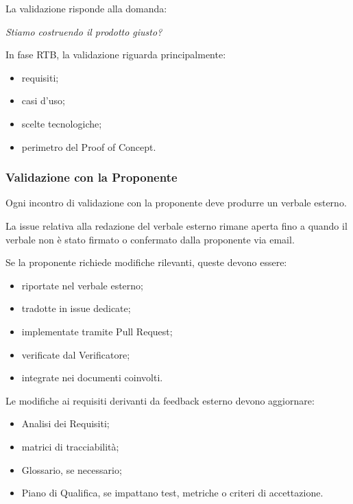 La validazione risponde alla domanda:

\begin{center}
    \textit{Stiamo costruendo il prodotto giusto?}
\end{center}

In fase RTB, la validazione riguarda principalmente:

\begin{itemize}
    \item requisiti;
    \item casi d'uso;
    \item scelte tecnologiche;
    \item perimetro del Proof of Concept.
\end{itemize}


\subsubsection{Validazione con la Proponente}

Ogni incontro di validazione con la proponente deve produrre un verbale esterno.

La issue relativa alla redazione del verbale esterno rimane aperta fino a quando
il verbale non è stato firmato o confermato dalla proponente via email.

Se la proponente richiede modifiche rilevanti, queste devono essere:

\begin{itemize}
    \item riportate nel verbale esterno;
    \item tradotte in issue dedicate;
    \item implementate tramite Pull Request;
    \item verificate dal Verificatore;
    \item integrate nei documenti coinvolti.
\end{itemize}

Le modifiche ai requisiti derivanti da feedback esterno devono aggiornare:

\begin{itemize}
    \item Analisi dei Requisiti;
    \item matrici di tracciabilità;
    \item Glossario, se necessario;
    \item Piano di Qualifica, se impattano test, metriche o criteri di accettazione.
\end{itemize}

